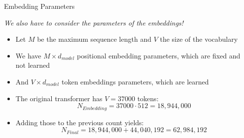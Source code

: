 
\begin{frame}{Embedding Parameters}

\textit{We also have to consider the parameters of the embeddings!}

\hspace{}

\begin{itemize}
    \item Let $M$ be the maximum sequence length and $V$ the size of the vocabulary
    \item We have $M \times d_{model}$ positional embedding parameters, which are fixed and not learned
    \item And $V \times d_{model}$ token embeddings parameters, which are learned
    \item The original transformer has $V = 37000$ tokens:
$$
N_{Embedding} = 37000 \cdot 512 = 18,944,000 
$$

\item Adding those to the previous count yields:
$$N_{Final} = 18,944,000 + 44,040,192 = 62,984,192$$ 

\end{itemize}
    
\end{frame}




\endlecture

